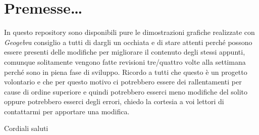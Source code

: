 \section{Premesse\dots}
In questo repository sono disponibili pure le dimostrazioni grafiche realizzate
con \textit{Geogebra} consiglio a tutti di dargli un occhiata e di stare
attenti perché possono essere presenti delle modifiche per migliorare il
contenuto degli stessi appunti, comunque solitamente vengono fatte revisioni
tre/quattro volte alla settimana perché sono in piena fase di sviluppo. Ricordo
a tutti che questo è un progetto volontario e che per questo motivo ci
potrebbero essere dei rallentamenti per cause di ordine superiore e quindi
potrebbero esserci meno modifiche del solito oppure potrebbero esserci degli
errori, chiedo la cortesia a voi lettori di contattarmi per apportare una
modifica.
\begin{center}
	Cordiali saluti
\end{center}

